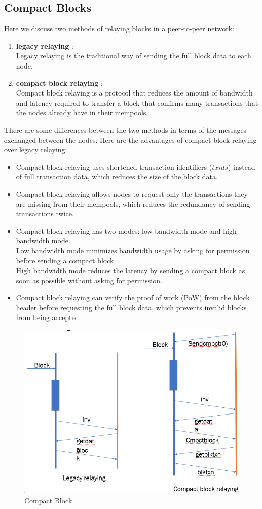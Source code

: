 \subsection{Compact Blocks}
Here we discuss two methods of relaying blocks in a peer-to-peer network:
\begin{enumerate}
    \item \textbf{legacy relaying} : \\
    Legacy relaying is the traditional way of sending the full block data to each node.
    \item \textbf{compact block relaying} : \\
    Compact block relaying is a protocol that reduces the amount of bandwidth and latency required to transfer a block that confirms many transactions that the nodes already have in their mempools.
\end{enumerate}
There are some differences between the two methods in terms of the messages exchanged between the nodes. Here are the advantages of compact block relaying over legacy relaying:
\begin{itemize}
    \item Compact block relaying uses shortened transaction identifiers ($txids$) instead of full transaction data, which reduces the size of the block data.
    \item Compact block relaying allows nodes to request only the transactions they are missing from their mempools, which reduces the redundancy of sending transactions twice.
    \item Compact block relaying has two modes: low bandwidth mode and high bandwidth mode.\\ Low bandwidth mode minimizes bandwidth usage by asking for permission before sending a compact block.\\ High bandwidth mode reduces the latency by sending a compact block as soon as possible without asking for permission.
    \item Compact block relaying can verify the proof of work (PoW) from the block header before requesting the full block data, which prevents invalid blocks from being accepted.
\end{itemize}
\begin{figure}[h!]
	\centering
	\includegraphics[width=0.6\linewidth]{Fig/04/F4}
	\caption{Compact Block}
	\label{fig:f4}
\end{figure}

